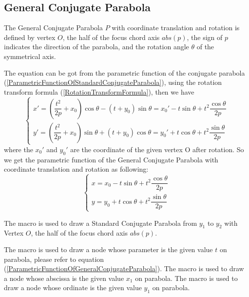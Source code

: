 \documentclass[11pt,english,BCOR=10mm,DIV=12,bibliography=totoc,parskip=false,headings=small,
    headinclude=false,footinclude=false,twoside,english]{pst-doc}
\begin{document}
\subsection{General Conjugate Parabola}
The General Conjugate Parabola $P$ with coordinate translation and rotation is defined by vertex $O$,
the half of the focus chord axis $abs(p)$, the sign of $p$ indicates the direction of the parabola,
and the rotation angle $\theta$ of the symmetrical axis.

The equation can be got from the parametric function of the conjugate parabola (\ref{ParametricFunctionOfStandardConjugateParabola}),
using the rotation transform formula (\ref{RotationTransformFormula}), then we have
\begin{equation}
\left\{\begin{array}{l}
x'=(\dfrac{t^2}{2p}+x_0)\cos\theta-(t+y_0)\sin\theta=x_0'-t\sin\theta+t^2\dfrac{\cos\theta}{2p}\\
y'=(\dfrac{t^2}{2p}+x_0)\sin\theta+(t+y_0)\cos\theta=y_0'+t\cos\theta+t^2\dfrac{\sin\theta}{2p}
\end{array}\right.
\end{equation}
where the $x_0'$ and $y_0'$ are the coordinate of the given vertex O after rotation.
So we get the parametric function of the General Conjugate Parabola with coordinate translation and rotation as following:
\begin{equation}\label{ParametricFunctionOfGeneralConjugateParabola}
\left\{\begin{array}{l}
x=x_0-t\sin\theta+t^2\dfrac{\cos\theta}{2p}\\
y=y_0+t\cos\theta+t^2\dfrac{\sin\theta}{2p}
\end{array}\right.
\end{equation}

The macro  is used to draw a Standard Conjugate Parabola from $y_1$ to $y_2$ with Vertex $O$,
the half of the focus chord axis $abs(p)$.

\begin{BDef}
\OptArgs{}\OptArg{$\theta$}
\end{BDef}

The macro  is used to draw a node whose parameter is the given value $t$ on parabola,
please refer to equation (\ref{ParametricFunctionOfGeneralConjugateParabola}).
The macro  is used to draw a node whose abscissa is the given value $x_1$ on parabola.
The macro  is used to draw a node whose ordinate is the given value $y_1$ on parabola.
\end{document}
